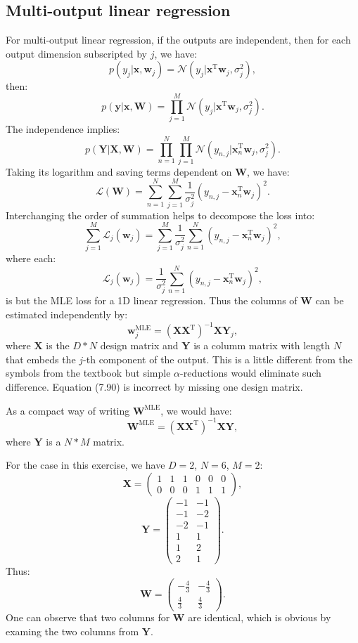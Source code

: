 \documentclass[UTF8]{ctexart}
\begin{document}
\subsection{Multi-output linear regression}
For multi-output linear regression, if the outputs are independent, then for each output dimension subscripted by $j$, we have:
$$p(y_{j}|\textbf{x},\textbf{w}_{j})=\mathcal{N}(y_{j}|\textbf{x}^{\text{T}}\textbf{w}_{j},\sigma^{2}_{j}),$$
then:
$$p(\textbf{y}|\textbf{x},\textbf{W})=\prod_{j=1}^{M}\mathcal{N}(y_{j}|\textbf{x}^{\text{T}}\textbf{w}_{j},\sigma^{2}_{j}).$$
The independence implies:
$$p(\textbf{Y}|\textbf{X},\textbf{W})=\prod_{n=1}^{N}\prod_{j=1}^{M}\mathcal{N}(y_{n,j}|\textbf{x}_{n}^{\text{T}}\textbf{w}_{j},\sigma^{2}_{j}).$$
Taking its logarithm and saving terms dependent on $\textbf{W}$, we have:
$$\mathcal{L}(\textbf{W})=\sum_{n=1}^{N}\sum_{j=1}^{M}\frac{1}{\sigma^{2}_{j}}\left(y_{n,j}-\textbf{x}^{\text{T}}_{n}\textbf{w}_{j} \right)^{2}.$$
Interchanging the order of summation helps to decompose the loss into:
$$\sum_{j=1}^{M}\mathcal{L}_{j}(\textbf{w}_{j})=\sum_{j=1}^{M}\frac{1}{\sigma^{2}_{j}}\sum_{n=1}^{N}\left(y_{n,j}-\textbf{x}^{\text{T}}_{n}\textbf{w}_{j} \right)^{2},$$
where each:
$$\mathcal{L}_{j}(\textbf{w}_{j})=\frac{1}{\sigma^{2}_{j}}\sum_{n=1}^{N}\left(y_{n,j}-\textbf{x}^{\text{T}}_{n}\textbf{w}_{j} \right)^{2},$$
is but the MLE loss for a 1D linear regression.
Thus the columns of $\textbf{W}$ can be estimated independently by:
$$\textbf{w}_{j}^{\text{MLE}}=(\textbf{X}\textbf{X}^{\text{T}})^{-1}\textbf{X}\textbf{Y}_{j},$$
where $\textbf{X}$ is the $D*N$ design matrix and $\textbf{Y}$ is a columm matrix with length $N$ that embeds the $j$-th component of the output.
This is a little different from the symbols from the textbook but simple $\alpha$-reductions would eliminate such difference.
Equation (7.90) is incorrect by missing one design matrix.

As a compact way of writing $\textbf{W}^{\text{MLE}}$, we would have:
$$\textbf{W}^{\text{MLE}}=(\textbf{X}\textbf{X}^{\text{T}})^{-1}\textbf{X}\textbf{Y},$$
where $\textbf{Y}$ is a $N*M$ matrix.

For the case in this exercise, we have $D=2$, $N=6$, $M=2$:
$$\textbf{X}=
\begin{pmatrix}
1 & 1 & 1 & 0 & 0 & 0 \\
0 & 0 & 0 & 1 & 1 & 1
\end{pmatrix},$$
$$\textbf{Y}=
\begin{pmatrix}
-1 & -1 \\
-1 & -2 \\
-2 & -1 \\
1 & 1 \\
1 & 2 \\
2 & 1
\end{pmatrix}.$$
Thus:
$$\textbf{W}=\begin{pmatrix}
-\frac{4}{3} & -\frac{4}{3}\\
\frac{4}{3} & \frac{4}{3}
\end{pmatrix}.$$
One can observe that two columns for $\textbf{W}$ are identical, which is obvious by examing the two columns from $\textbf{Y}$.
\end{document}
